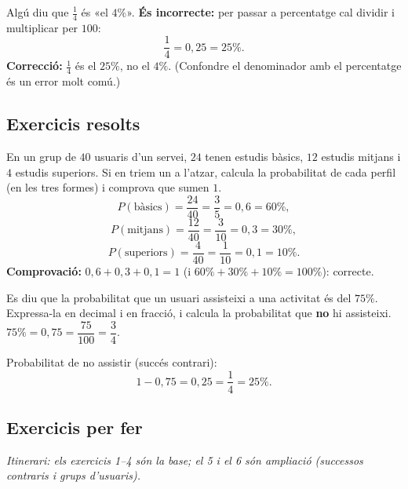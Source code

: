 \begin{exemple}
Algú diu que $\frac{1}{4}$ és «el $4\%$». \textbf{És incorrecte:} per passar a
percentatge cal dividir i multiplicar per $100$:
\[
\frac{1}{4}=0,25=25\%.
\]
\textbf{Correcció:} $\frac{1}{4}$ és el $25\%$, no el $4\%$. (Confondre el denominador
amb el percentatge és un error molt comú.)
\end{exemple}

\subsection{Exercicis resolts}

\begin{exresolt}
En un grup de $40$ usuaris d'un servei, $24$ tenen estudis bàsics, $12$ estudis mitjans
i $4$ estudis superiors. Si en triem un a l'atzar, calcula la probabilitat de cada
perfil (en les tres formes) i comprova que sumen $1$.
\solucio
\[
P(\text{bàsics})=\frac{24}{40}=\frac{3}{5}=0,6=60\%,
\]
\[
P(\text{mitjans})=\frac{12}{40}=\frac{3}{10}=0,3=30\%,
\]
\[
P(\text{superiors})=\frac{4}{40}=\frac{1}{10}=0,1=10\%.
\]
\textbf{Comprovació:} $0,6+0,3+0,1=1$ (i $60\%+30\%+10\%=100\%$): correcte.
\end{exresolt}

\begin{exresolt}
Es diu que la probabilitat que un usuari assisteixi a una activitat és del $75\%$.
Expressa-la en decimal i en fracció, i calcula la probabilitat que \textbf{no} hi
assisteixi.
\solucio
$75\%=0,75=\dfrac{75}{100}=\dfrac{3}{4}$.

Probabilitat de no assistir (succés contrari):
\[
1-0,75=0,25=\frac{1}{4}=25\%.
\]
\end{exresolt}

\subsection{Exercicis per fer}

\noindent\textit{Itinerari: els exercicis 1–4 són la base; el 5 i el 6 són ampliació
(successos contraris i grups d'usuaris).}

